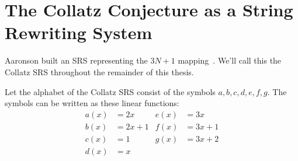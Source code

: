 \section{The Collatz Conjecture as a String Rewriting System} \label{subsec:CollatzSRS}
Aaronson built an SRS representing the $3N+1$ mapping~\cite{HeuleAaronson}. We'll call this the Collatz SRS throughout the remainder of this thesis. \par
Let the alphabet of the Collatz SRS consist of the symbols $a, b, c, d, e, f, g$. The symbols can be written as these linear functions:
\begin{align*}
  a(x) &= 2x & e(x) &= 3x \\
  b(x) &= 2x+1 & f(x) &= 3x+1 \\
  c(x) &= 1 & g(x) &= 3x+2 \\
  d(x) &= x & & 
\end{align*}

